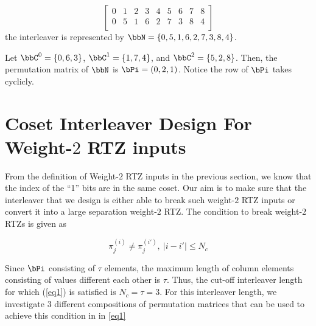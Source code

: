 \documentclass[11pt, oneside, dvipdfmx]{book}
\begin{document}
$$  
 \begin{bmatrix}
0 & 1 & 2 & 3 & 4 & 5 & 6 & 7 & 8 \\
0 & 5 & 1 & 6 & 2 & 7 & 3 & 8 & 4 \\
\end{bmatrix}
$$
the interleaver is represented by $\bbN=\{0,5,1,6,2,7,3,8,4\}$.

Let $\bbC^0=\{0,6,3\}$, $\bbC^1=\{1,7,4\}$, and $\bbC^2=\{5,2,8\}$. Then, the permutation matrix of $\bbN$ is
$\bPi = (0,2,1)$. Notice the row of $\bPi$ takes cyclicly.


\section{Coset Interleaver Design For Weight-$2$ RTZ inputs}
From the definition of Weight-$2$ RTZ inputs in the previous section, we know that the index of the ``1'' bits are in the same coset. Our aim is to make sure that the interleaver that we design is either able to break such weight-$2$ RTZ inputs or convert it into a large separation weight-$2$ RTZ. 
The condition to break weight-$2$ RTZs is given as

\begin{equation}
\pi_{j}^{(i)} \neq \pi_{j}^{(i')},~|i-i'| \leq N_c
\label{eq1}
\end{equation}

Since $\bPi$ consisting of $\tau$ elements, the maximum length of column elements consisting of values different each other is $\tau$. Thus, the cut-off interleaver length for which (\ref{eq1}) is satisfied is $N_c=\tau=3$.
For this interleaver length, we investigate 3 different compositions of permutation matrices that can be used to achieve this condition in in \ref{eq1}
\end{document}
